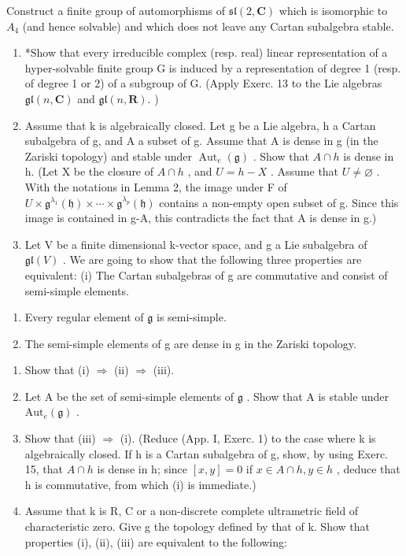 Construct a finite group of automorphisms of \(\mathfrak{sl}(2,\mathbf{C})\) which is isomorphic to \(A_{4}\) (and hence solvable) and which does not leave any Cartan subalgebra stable.

\begin{enumerate}
\def\labelenumi{\arabic{enumi})}
\setcounter{enumi}{13}
\item
  *Show that every irreducible complex (resp. real) linear representation of a hyper-solvable finite group G is induced by a representation of degree 1 (resp. of degree 1 or 2) of a subgroup of G. (Apply Exerc. 13 to the Lie algebras \(\mathfrak{gl}(n,\mathbf{C})\) and \(\mathfrak{gl}(n,\mathbf{R}).\) )
\item
  Assume that k is algebraically closed. Let g be a Lie algebra, h a Cartan subalgebra of g, and A a subset of g. Assume that A is dense in g (in the Zariski topology) and stable under \(\operatorname{Aut}_{e}(\mathfrak{g})\) . Show that \(A \cap h\) is dense in h. (Let X be the closure of \(A \cap h\) , and \(U = h - X\) . Assume that \(U \neq \varnothing\) . With the notations in Lemma 2, the image under F of \(U \times \mathfrak{g}^{\lambda_{1}}(\mathfrak{h}) \times \cdots \times \mathfrak{g}^{\lambda_{p}}(\mathfrak{h})\) contains a non-empty open subset of g. Since this image is contained in g-A, this contradicts the fact that A is dense in g.)
\item
  Let V be a finite dimensional k-vector space, and g a Lie subalgebra of \(\mathfrak{gl}(V)\) . We are going to show that the following three properties are equivalent: (i) The Cartan subalgebras of g are commutative and consist of semi-simple elements.
\end{enumerate}

\begin{enumerate}
\def\labelenumi{(\roman{enumi})}
\setcounter{enumi}{1}
\item
  Every regular element of \(\mathfrak{g}\) is semi-simple.
\item
  The semi-simple elements of g are dense in g in the Zariski topology.
\end{enumerate}

\begin{enumerate}
\def\labelenumi{\alph{enumi})}
\item
  Show that (i) \(\Longrightarrow\) (ii) \(\Longrightarrow\) (iii).
\item
  Let A be the set of semi-simple elements of \(\mathfrak{g}\) . Show that A is stable under \(\mathrm{Aut}_e(\mathfrak{g})\) .
\item
  Show that (iii) \(\Longrightarrow\) (i). (Reduce (App. I, Exerc. 1) to the case where k is algebraically closed. If h is a Cartan subalgebra of g, show, by using Exerc. 15, that \(A \cap h\) is dense in h; since \([x, y] = 0\) if \(x \in A \cap h, y \in h\) , deduce that h is commutative, from which (i) is immediate.)
\item
  Assume that k is R, C or a non-discrete complete ultrametric field of characteristic zero. Give g the topology defined by that of k. Show that properties (i), (ii), (iii) are equivalent to the following:
\end{enumerate}

